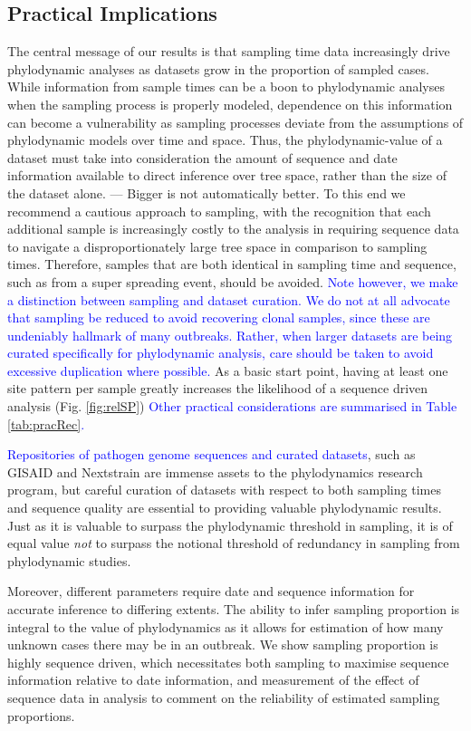 \documentclass{article}
\begin{document}
\subsection*{Practical Implications}
The central message of our results is that sampling time data increasingly drive phylodynamic analyses as datasets grow in the proportion of sampled cases. While information from sample times can be a boon to phylodynamic analyses when the sampling process is properly modeled, dependence on this information can become a vulnerability as sampling processes deviate from the assumptions of phylodynamic models over time and space. Thus, the phylodynamic-value of a dataset must take into consideration the amount of sequence and date information available to direct inference over tree space, rather than the size of the dataset alone. --- Bigger is not automatically better. To this end we recommend a cautious approach to sampling, with the recognition that each additional sample is increasingly costly to the analysis in requiring sequence data to navigate a disproportionately large tree space in comparison to sampling times. Therefore, samples that are both identical in sampling time and sequence, such as from a super spreading event, should be avoided. \textcolor{blue}{Note however, we make a distinction between sampling and dataset curation. We do not at all advocate that sampling be reduced to avoid recovering clonal samples, since these are undeniably hallmark of many outbreaks. Rather, when larger datasets are being curated specifically for phylodynamic analysis, care should be taken to avoid excessive duplication where possible.} As a basic start point, having at least one site pattern per sample greatly increases the likelihood of a sequence driven analysis (Fig. \ref{fig:relSP}) \textcolor{blue}{Other practical considerations are summarised in Table \ref{tab:pracRec}.}

\textcolor{blue}{Repositories of pathogen genome sequences and curated datasets}, such as GISAID and Nextstrain are immense assets to the phylodynamics research program, but careful curation of datasets with respect to both sampling times and sequence quality are essential to providing valuable phylodynamic results. Just as it is valuable to surpass the phylodynamic threshold in sampling, it is of equal value \textit{not} to surpass the notional threshold of redundancy in sampling from phylodynamic studies.

Moreover, different parameters require date and sequence information for accurate inference to differing extents. The ability to infer sampling proportion is integral to the value of phylodynamics as it allows for estimation of how many unknown cases there may be in an outbreak. We show sampling proportion is highly sequence driven, which necessitates both sampling to maximise sequence information relative to date information, and measurement of the effect of sequence data in analysis to comment on the reliability of estimated sampling proportions.
\end{document}
